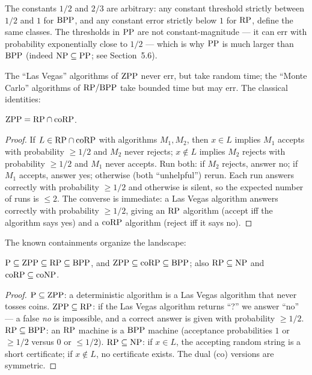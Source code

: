 The constants $1/2$ and $2/3$ are arbitrary: any constant threshold strictly between $1/2$ and $1$ for $\text{BPP}$, and any constant error strictly below $1$ for $\text{RP}$, define the same classes. The thresholds in $\text{PP}$ are not constant-magnitude --- it can err with probability exponentially close to $1/2$ --- which is why $\text{PP}$ is much larger than $\text{BPP}$ (indeed $\text{NP} \subseteq \text{PP}$; see Section~5.6).

The ``Las Vegas'' algorithms of $\text{ZPP}$ never err, but take random time; the ``Monte Carlo'' algorithms of $\text{RP}/\text{BPP}$ take bounded time but may err. The classical identities:

\begin{theorem}
$\text{ZPP} = \text{RP} \cap \text{coRP}$.
\end{theorem}

\begin{proof}
If $L \in \text{RP} \cap \text{coRP}$ with algorithms $M_1, M_2$, then $x \in L$ implies $M_1$ accepts with probability $\ge 1/2$ and $M_2$ never rejects; $x \notin L$ implies $M_2$ rejects with probability $\ge 1/2$ and $M_1$ never accepts. Run both: if $M_2$ rejects, answer no; if $M_1$ accepts, answer yes; otherwise (both ``unhelpful'') rerun. Each run answers correctly with probability $\ge 1/2$ and otherwise is silent, so the expected number of runs is $\le 2$. The converse is immediate: a Las Vegas algorithm answers correctly with probability $\ge 1/2$, giving an $\text{RP}$ algorithm (accept iff the algorithm says yes) and a $\text{coRP}$ algorithm (reject iff it says no).
\end{proof}

The known containments organize the landscape:

\begin{theorem}
$\text{P} \subseteq \text{ZPP} \subseteq \text{RP} \subseteq \text{BPP}$, and $\text{ZPP} \subseteq \text{coRP} \subseteq \text{BPP}$; also $\text{RP} \subseteq \text{NP}$ and $\text{coRP} \subseteq \text{coNP}$.
\end{theorem}

\begin{proof}
$\text{P} \subseteq \text{ZPP}$: a deterministic algorithm is a Las Vegas algorithm that never tosses coins. $\text{ZPP} \subseteq \text{RP}$: if the Las Vegas algorithm returns ``?'' we answer ``no'' --- a false \emph{no} is impossible, and a correct answer is given with probability $\ge 1/2$. $\text{RP} \subseteq \text{BPP}$: an $\text{RP}$ machine is a $\text{BPP}$ machine (acceptance probabilities $1$ or $\ge 1/2$ versus $0$ or $\le 1/2$). $\text{RP} \subseteq \text{NP}$: if $x \in L$, the accepting random string is a short certificate; if $x \notin L$, no certificate exists. The dual (co) versions are symmetric.
\end{proof}

